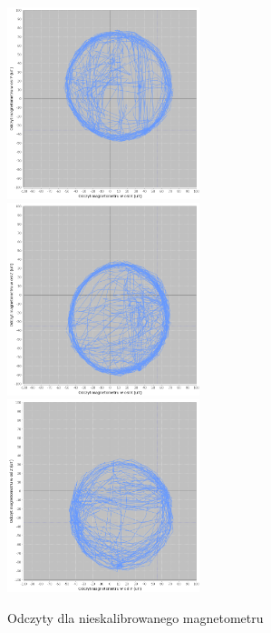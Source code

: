 \begin{figure}[h!]
    \centering
    \includegraphics[width=0.5\textwidth]{Rysunki/Rozdzial03/Magnetometr_nieskalibrowany_XY.png}
    \includegraphics[width=0.5\textwidth]{Rysunki/Rozdzial03/Magnetometr_nieskalibrowany_XZ.png}
    \includegraphics[width=0.5\textwidth]{Rysunki/Rozdzial03/Magnetometr_nieskalibrowany_YZ.png}
    \caption{Odczyty dla nieskalibrowanego magnetometru}
    \label{Magnetometr nieskalibrowany}
\end{figure}

